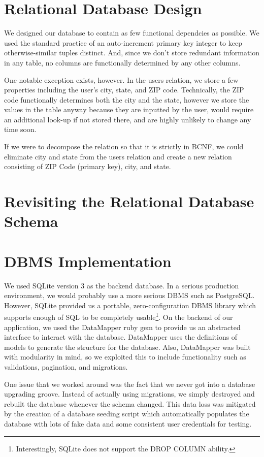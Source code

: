\documentclass{acm_proc_article-sp}
\begin{document}
\section{Relational Database Design}
We designed our database to contain as few functional dependcies as possible. We used the standard practice of an
auto-increment primary key integer to keep otherwise-similar tuples distinct. And, since we don't store redundant information
in any table, no columns are functionally determined by any other columns.

One notable exception exists, however. In the users relation, we store a few properties including the user's city, state, and ZIP code. 
Technically, the ZIP code functionally determines both the city and the state, however we store the values in the table
anyway because they are inputted by the user, would require an additional look-up if not stored there, and are highly unlikely
to change any time soon. 

If we were to decompose the relation so that it is strictly in BCNF, we could eliminate city and state from the users
relation and create a new relation consisting of ZIP Code (primary key), city, and state.
\section{Revisiting the Relational Database Schema}
\section{DBMS Implementation}
We used SQLite version 3 as the backend database. In a serious production environment, we would probably use
a more serious DBMS such as PostgreSQL. However, SQLite provided us a portable, zero-configuration DBMS library
which supports enough of SQL to be completely usable\footnote{Interestingly, SQLite does not support the DROP COLUMN ability.}.
On the backend of our application, we used the DataMapper ruby gem to provide us an abstracted interface to
interact with the database. DataMapper uses the definitions of models to generate the structure for the database.
Also, DataMapper was built with modularity in mind, so we exploited this to include functionality such as validations,
pagination, and migrations.

One issue that we worked around was the fact that we never got into a database upgrading groove. Instead of actually
using migrations, we simply destroyed and rebuilt the database whenever the schema changed. This data loss was mitigated
by the creation of a database seeding script which automatically populates the database with lots of fake data and some
consistent user credentials for testing.
\end{document}
